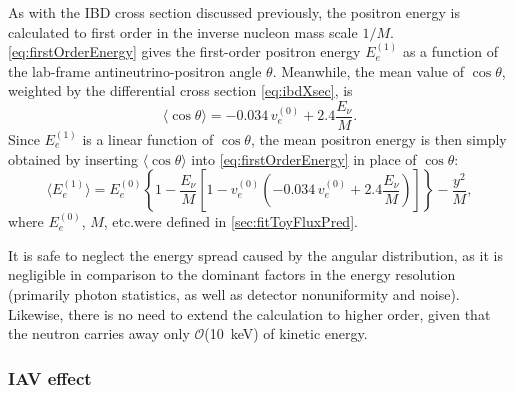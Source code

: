 \documentclass[../thesis.tex]{subfiles}
\begin{document}
As with the IBD cross section discussed previously, the positron energy is calculated to first order in the inverse nucleon mass scale $1/M$. \autoref{eq:firstOrderEnergy} gives the first-order positron energy $E_e^{(1)}$ as a function of the lab-frame antineutrino-positron angle $\theta$. Meanwhile, the mean value of $\cos\theta$, weighted by the differential cross section \autoref{eq:ibdXsec}, is \cite{Vogel_1999}
\begin{equation}
  \label{eq:meanIbdAngle}
  \langle \cos \theta \rangle = -0.034\, v_e^{(0)} + 2.4 \frac{E_\nu}{M}.
\end{equation}
Since $E_e^{(1)}$ is a linear function of $\cos\theta$, the mean positron energy is then simply obtained by inserting $\langle \cos\theta \rangle$ into \autoref{eq:firstOrderEnergy} in place of $\cos\theta$:
\begin{equation}
  \label{eq:firstOrderEnergyMean}
  \langle E_e^{(1)} \rangle = E_e^{(0)}
  \left\{1 - \frac{E_{\nu}}{M}\left[1 - v_e^{(0)} \left(-0.034\, v_e^{(0)} + 2.4 \frac{E_\nu}{M}\right)\right] \right\}
  - \frac{y^2}{M},
\end{equation}
where $E_e^{(0)}$, $M$, etc.\@ were defined in \autoref{sec:fitToyFluxPred}.

It is safe to neglect the energy spread caused by the angular distribution, as it is negligible in comparison to the dominant factors in the energy resolution (primarily photon statistics, as well as detector nonuniformity and noise). Likewise, there is no need to extend the calculation to higher order, given that the neutron carries away only $\mathcal{O}$(10~keV) of kinetic energy.

\subsubsection{IAV effect}
\label{sec:fitIavEffect}

\newcommand\Miav{\mathbf{M}^{\mathrm{IAV}}}
\newcommand\Eetrue[1]{E^{\mathrm{true}}_{e#1}}
\newcommand\Eels[1]{E^{\mathrm{LS}}_{e#1}}
\end{document}
